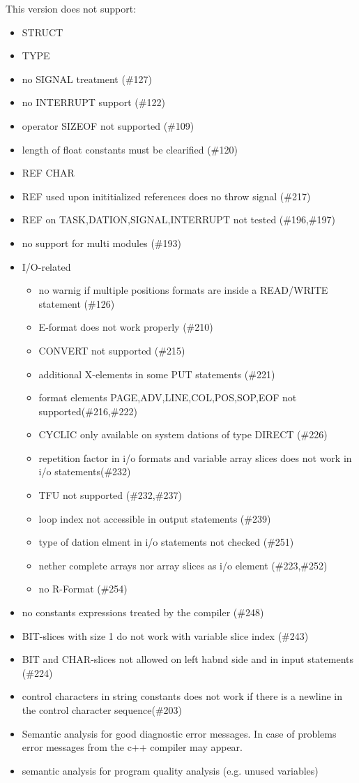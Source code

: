 \documentclass[10pt]{scrbook}
\begin{document}
This version does not support:
\begin{itemize}
\item STRUCT
\item TYPE
\item no SIGNAL treatment (\#127)
\item no INTERRUPT support (\#122)
\item operator SIZEOF not supported (\#109)
\item length of float constants must be clearified (\#120)
\item REF CHAR
\item REF used upon inititialized references does no throw signal (\#217)
\item REF on TASK,DATION,SIGNAL,INTERRUPT not tested (\#196,\#197)
\item no support for multi modules (\#193)
\item I/O-related
   \begin{itemize}
   \item no warnig if multiple positions formats are inside a READ/WRITE statement (\#126)
   \item E-format does not work properly (\#210)
   \item CONVERT not supported (\#215)
   \item additional X-elements in some PUT statements (\#221)
   \item format elements PAGE,ADV,LINE,COL,POS,SOP,EOF not supported(\#216,\#222)
   \item CYCLIC only available on system dations of type DIRECT (\#226)
   \item repetition factor in i/o formats and variable array slices 
      does not work in i/o statements(\#232)
   \item TFU not supported (\#232,\#237)
   \item  loop index not accessible in output statements (\#239)
   \item type of dation elment in i/o statements not checked (\#251)
   \item nether complete arrays nor array slices as i/o element (\#223,\#252)
   \item no R-Format (\#254)
   \end{itemize}
\item no constants expressions treated by the compiler (\#248)
\item BIT-slices with size 1 do not work with variable slice index (\#243)
\item BIT and CHAR-slices not allowed on left habnd side and in input statements
    (\#224)
\item control characters in string constants does not work if 
    there is a newline in the control character sequence(\#203) 

\item Semantic analysis for good diagnostic error messages.
     In case of problems error messages from the c++ compiler may appear. 
\item semantic analysis for program quality analysis (e.g. unused variables)
\end{itemize}
\end{document}
